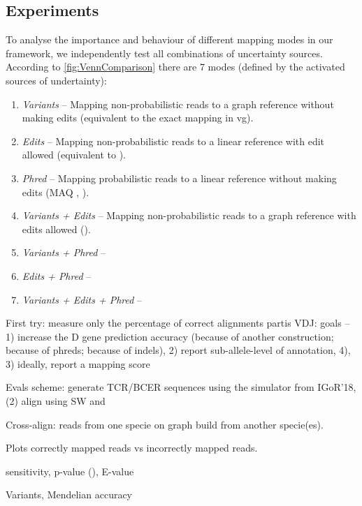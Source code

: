 \subsection{Experiments}
To analyse the importance and behaviour of different mapping modes in our framework, we independently test all combinations of uncertainty sources.
According to \ref{fig:VennComparison} there are 7 modes (defined by the activated sources of undertainty):
\begin{enumerate}
	\item \textit{Variants} -- Mapping non-probabilistic reads to a graph reference without making edits (equivalent to the exact mapping in vg).
	\item \textit{Edits} -- Mapping non-probabilistic reads to a linear reference with edit allowed (equivalent to \cite{rautiainen2017aligning}).
	\item \textit{Phred} -- Mapping probabilistic reads to a linear reference without making edits (MAQ \cite{maq2008mapping}, ).
	\item \textit{Variants + Edits} -- Mapping non-probabilistic reads to a graph reference with edits allowed ().

	\item \textit{Variants + Phred} -- 
	\item \textit{Edits + Phred} -- 
	\item \textit{Variants + Edits + Phred} --
\end{enumerate}

First try: measure only the percentage of correct alignments
partis VDJ: goals -- 1) increase the D gene prediction accuracy (because of another construction; because of phreds; because of indels), 2) report sub-allele-level of annotation, 4),  3) ideally, report a mapping score

Evals scheme: generate TCR/BCER sequences using the simulator from IGoR'18\cite{marcou2018high}, (2) align using SW and \tool 

Cross-align: reads from one specie on graph build from another specie(es).

Plots correctly mapped reads vs incorrectly mapped reads\cite{frith2010parameters}.

sensitivity, p-value (), E-value

Variants, Mendelian accuracy\cite{eggertsson2017graphtyper}

